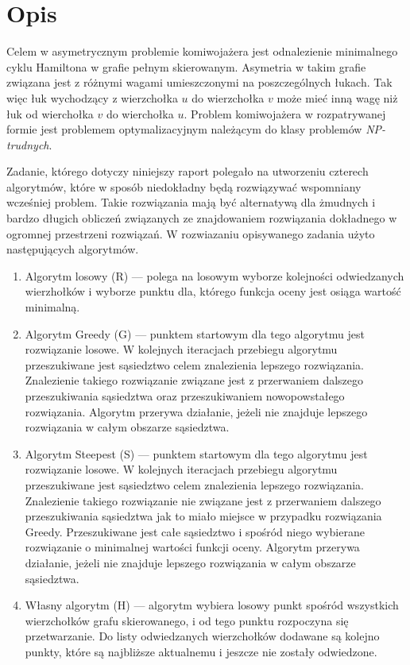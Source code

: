 \section{Opis}

Celem w asymetrycznym problemie komiwojażera jest odnalezienie
minimalnego cyklu Hamiltona w grafie pełnym skierowanym.
Asymetria w takim grafie związana jest z różnymi wagami
umieszczonymi na poszczególnych łukach. Tak więc łuk wychodzący z wierzchołka
$u$ do wierzchołka $v$ może mieć inną wagę niż łuk
od wierchołka $v$ do wierchołka $u$. Problem komiwojażera w rozpatrywanej
formie jest problemem optymalizacyjnym należącym do klasy problemów
\emph{NP-trudnych}.

Zadanie, którego dotyczy niniejszy raport polegało na utworzeniu czterech
algorytmów, które w sposób niedokładny będą rozwiązywać wspomniany
wcześniej problem. Takie rozwiązania mają być alternatywą dla żmudnych
i bardzo długich obliczeń związanych ze znajdowaniem rozwiązania
dokładnego w ogromnej przestrzeni rozwiązań.
W rozwiazaniu opisywanego zadania użyto następujących algorytmów.

\begin{enumerate}

\item Algorytm losowy (R) --- polega na losowym wyborze kolejności
odwiedzanych wierzhołków i wyborze punktu dla, którego funkcja
oceny jest osiąga wartość minimalną.

\item Algorytm Greedy (G) --- punktem startowym dla tego algorytmu jest
rozwiązanie losowe. W kolejnych iteracjach przebiegu algorytmu przeszukiwane
jest sąsiedztwo celem znalezienia lepszego rozwiązania. Znalezienie takiego
rozwiązanie związane jest z przerwaniem dalszego przeszukiwania sąsiedztwa
oraz przeszukiwaniem nowopowstałego rozwiązania.
Algorytm przerywa działanie, jeżeli nie znajduje lepszego rozwiązania w
całym obszarze sąsiedztwa.

\item Algorytm Steepest (S) --- punktem startowym dla tego algorytmu jest
rozwiązanie losowe. W kolejnych iteracjach przebiegu algorytmu przeszukiwane
jest sąsiedztwo celem znalezienia lepszego rozwiązania. Znalezienie takiego
rozwiązanie nie związane jest z przerwaniem dalszego przeszukiwania sąsiedztwa
jak to miało miejsce w przypadku rozwiązania Greedy. Przeszukiwane jest
całe sąsiedztwo i spośród niego wybierane rozwiązanie o minimalnej wartości
funkcji oceny.
Algorytm przerywa działanie, jeżeli nie znajduje lepszego rozwiązania w
całym obszarze sąsiedztwa.

\item Własny algorytm (H) --- algorytm wybiera losowy punkt spośród wszystkich
wierzchołków grafu skierowanego, i od tego punktu rozpoczyna się
przetwarzanie. Do listy odwiedzanych wierzchołków dodawane są kolejno
punkty, które są najbliższe aktualnemu i jeszcze nie zostały odwiedzone.

\end{enumerate}

